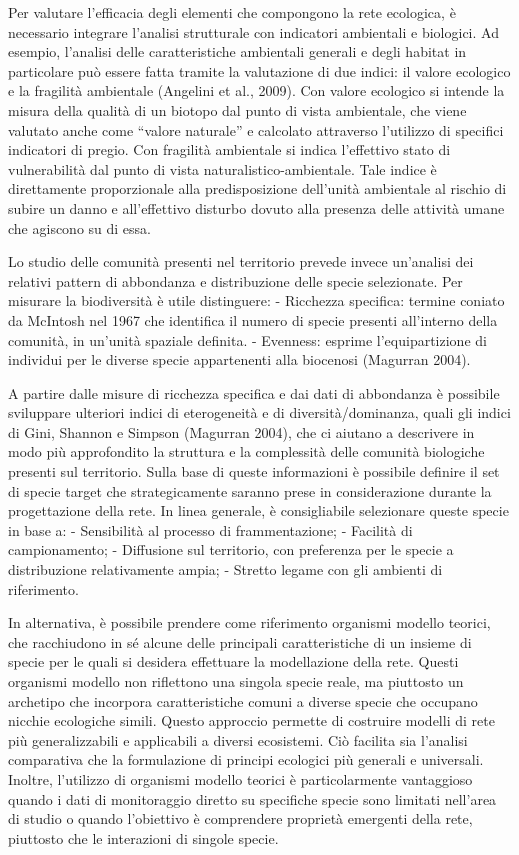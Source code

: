 \documentclass[
]{book}
\begin{document}
Per valutare l'efficacia degli elementi che compongono la rete
ecologica, è necessario integrare l'analisi strutturale con indicatori
ambientali e biologici. Ad esempio, l'analisi delle caratteristiche
ambientali generali e degli habitat in particolare può essere fatta
tramite la valutazione di due indici: il valore ecologico e la fragilità
ambientale (Angelini et al., 2009). Con valore ecologico si intende la
misura della qualità di un biotopo dal punto di vista ambientale, che
viene valutato anche come ``valore naturale'' e calcolato attraverso
l'utilizzo di specifici indicatori di pregio. Con fragilità ambientale
si indica l'effettivo stato di vulnerabilità dal punto di vista
naturalistico-ambientale. Tale indice è direttamente proporzionale alla
predisposizione dell'unità ambientale al rischio di subire un danno e
all'effettivo disturbo dovuto alla presenza delle attività umane che
agiscono su di essa.

Lo studio delle comunità presenti nel territorio prevede invece
un'analisi dei relativi pattern di abbondanza e distribuzione delle
specie selezionate. Per misurare la biodiversità è utile distinguere: -
Ricchezza specifica: termine coniato da McIntosh nel 1967 che identifica
il numero di specie presenti all'interno della comunità, in un'unità
spaziale definita. - Evenness: esprime l'equipartizione di individui per
le diverse specie appartenenti alla biocenosi (Magurran 2004).

A partire dalle misure di ricchezza specifica e dai dati di abbondanza è
possibile sviluppare ulteriori indici di eterogeneità e di
diversità/dominanza, quali gli indici di Gini, Shannon e Simpson
(Magurran 2004), che ci aiutano a descrivere in modo più approfondito la
struttura e la complessità delle comunità biologiche presenti sul
territorio. Sulla base di queste informazioni è possibile definire il
set di specie target che strategicamente saranno prese in considerazione
durante la progettazione della rete. In linea generale, è consigliabile
selezionare queste specie in base a: - Sensibilità al processo di
frammentazione; - Facilità di campionamento; - Diffusione sul
territorio, con preferenza per le specie a distribuzione relativamente
ampia; - Stretto legame con gli ambienti di riferimento.

In alternativa, è possibile prendere come riferimento organismi modello
teorici, che racchiudono in sé alcune delle principali caratteristiche
di un insieme di specie per le quali si desidera effettuare la
modellazione della rete. Questi organismi modello non riflettono una
singola specie reale, ma piuttosto un archetipo che incorpora
caratteristiche comuni a diverse specie che occupano nicchie ecologiche
simili. Questo approccio permette di costruire modelli di rete più
generalizzabili e applicabili a diversi ecosistemi. Ciò facilita sia
l'analisi comparativa che la formulazione di principi ecologici più
generali e universali. Inoltre, l'utilizzo di organismi modello teorici
è particolarmente vantaggioso quando i dati di monitoraggio diretto su
specifiche specie sono limitati nell'area di studio o quando l'obiettivo
è comprendere proprietà emergenti della rete, piuttosto che le
interazioni di singole specie.
\end{document}

